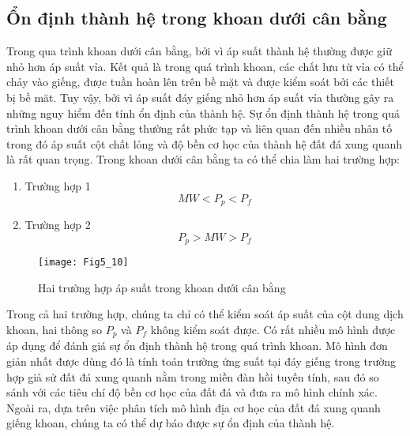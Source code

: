 \documentclass[12pt,a4paper]{article}
\begin{document}
\subsection{Ổn định thành hệ trong khoan dưới cân bằng}
Trong qua trình khoan dưới cân bằng, bởi vì áp suất thành hệ thường được giữ nhỏ hơn áp suất vỉa. Kết quả là trong quá trình khoan, các chất lưu từ vỉa có thể chảy vào giếng, được tuần hoàn lên trên bề mặt và được kiểm soát bởi các thiết bị bề măt. Tuy vậy, bởi vì áp suất đáy giếng nhỏ hơn áp suất vỉa thường gây ra những nguy hiểm đến tính ổn định của thành hệ.
\newline
Sự ổn định thành hệ trong quá trình khoan dưới cân bằng thường\cite{mclellan1999borehole} rất phức tạp và liên quan đến nhiều nhân tố trong đó áp suất cột chất lỏng và độ bền cơ học của thành hệ đất đá xung quanh là rất quan trọng. Trong khoan dưới cân bằng ta có thể chia làm hai trường hợp:
\begin{enumerate}
	\item[] Trường hợp 1
	\begin{equation}
	MW<P_{p}<P_{f}
	\end{equation}
	\item[] Trường hợp 2
	\begin{equation}
	P_{p}>MW>P_{f}
	\end{equation}
\end{enumerate}
\clearpage
\begin{figure}
\centering
\texttt{[image: Fig5\_10]}
\caption{Hai trường hợp áp suất trong khoan dưới cân bằng\cite{guo2002gas}}
\end{figure}
Trong cả hai trường hợp, chúng ta chỉ có thể kiểm soát áp suất của cột dung dịch khoan, hai thông so $P_{p}$ và $P_{f}$ không kiểm soát được. Có rất nhiều mô hình được áp dụng để đánh giá sự ổn định thành hệ trong quá trình khoan. Mô hình đơn giản nhất được dùng đó là tính toán trường ứng suất tại đáy giếng trong trường hợp giả sử đất đá xung quanh nằm trong miền đàn hồi tuyến tính, sau đó so sánh với các tiêu chí độ bền cơ học của đất đá và đưa ra mô hình chính xác. Ngoài ra, dựa trên việc phân tích mô hình địa cơ học của đất đá xung quanh giếng khoan, chúng ta có thể dự báo được sự ổn định của thành hệ.
\end{document}
